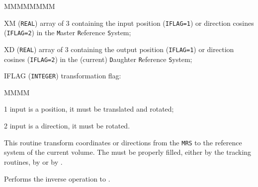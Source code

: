          
         

 
\begin{DLtt}{MMMMMMMM}
\item[XM] ({\tt REAL}) array of 3 containing the input position
({\tt IFLAG=1}) or direction cosines ({\tt IFLAG=2}) in the {\tt M}aster
{\tt R}eference {\tt S}ystem;
\item[XD] ({\tt REAL}) array of 3 containing the output position
({\tt IFLAG=1}) or direction cosines ({\tt IFLAG=2}) in the 
(current) {\tt D}aughter {\tt R}eference {\tt S}ystem;
\item[IFLAG] ({\tt INTEGER}) transformation flag:
\begin{DLtt}{MMMM}
\item[1] input is a position, it must be translated and rotated;
\item[2] input is a direction, it must be rotated.
\end{DLtt}
\end{DLtt}

This routine transform coordinates or directions from the {\tt MRS}
to the reference system of the current volume. The
 must be properly filled, either by the tracking
routines, by  or by .

Performs the inverse operation to .
